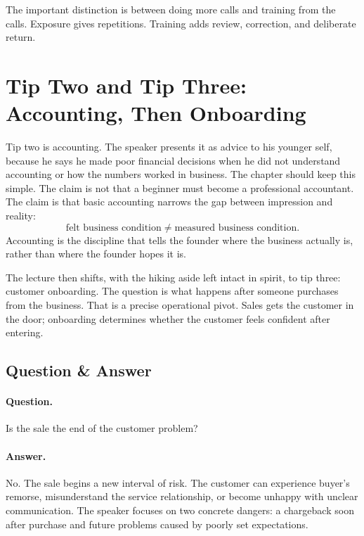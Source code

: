 The important distinction is between doing more calls and training from the calls. Exposure gives repetitions. Training adds review, correction, and deliberate return.

\section{Tip Two and Tip Three: Accounting, Then Onboarding}

Tip two is accounting. The speaker presents it as advice to his younger self, because he says he made poor financial decisions when he did not understand accounting or how the numbers worked in business. The chapter should keep this simple. The claim is not that a beginner must become a professional accountant. The claim is that basic accounting narrows the gap between impression and reality:
\[
\text{felt business condition}
\neq
\text{measured business condition}.
\]
Accounting is the discipline that tells the founder where the business actually is, rather than where the founder hopes it is.

The lecture then shifts, with the hiking aside left intact in spirit, to tip three: customer onboarding. The question is what happens after someone purchases from the business. That is a precise operational pivot. Sales gets the customer in the door; onboarding determines whether the customer feels confident after entering.

\subsection{Question \& Answer}

\paragraph{Question.}
Is the sale the end of the customer problem?

\paragraph{Answer.}
No. The sale begins a new interval of risk. The customer can experience buyer's remorse, misunderstand the service relationship, or become unhappy with unclear communication. The speaker focuses on two concrete dangers: a chargeback soon after purchase and future problems caused by poorly set expectations.


